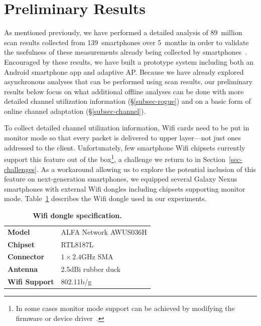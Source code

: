 \section{Preliminary Results}
\label{sec-results}

As mentioned previously, we have performed a detailed analysis of 89~million
scan results collected from 139~smartphones over 5~months in order to
validate the usefulness of these measurements already being collected by
smartphones~\cite{conext14-pocketsniffer}. Encouraged by these results, we
have built a prototype \PS{} system including both an Android smartphone app
and adaptive AP. Because we have already explored asynchronous analyses that
can be performed using scan results, our preliminary results below focus on
what additional offline analyses can be done with more detailed channel
utilization information (\S\ref{subsec-rogue}) and on a basic form of online
channel adaptation (\S\ref{subsec-channel}).

To collect detailed channel utilization information, Wifi cards need to be
put in monitor mode so that every packet is delivered to upper layer---not
just ones addressed to the client. Unfortunately, few smartphone Wifi
chipsets currently support this feature out of the box\footnote{In some cases
monitor mode support can be achieved by modifying the firmware or device
driver~\cite{bcmon}.}, a challenge we return to in
Section~\ref{sec-challenges}. As a workaround allowing us to explore the
potential inclusion of this feature on next-generation smartphones, we
equipped several Galaxy Nexus~\cite{galaxynexus} smartphones with external
Wifi dongles including chipsets supporting monitor mode.
Table~\ref{tab:dongle} describes the Wifi dongle used in our experiments.

\begin{table}[t!]
  \centering
  {\small
  \begin{tabular}{ll}
    \toprule
    \textbf{Model} & ALFA Network AWUS036H \\
    \textbf{Chipset} & RTL8187L \\
    \textbf{Connector} & $1\times2.4$GHz SMA \\
    \textbf{Antenna} & 2.5dBi rubber duck \\
    \textbf{Wifi Support} & 802.11b/g \\
    \bottomrule
  \end{tabular}
}
  \caption{\textbf{Wifi dongle specification.}}
  \label{tab:dongle}
  \vspace*{-0.1in}
\end{table}


